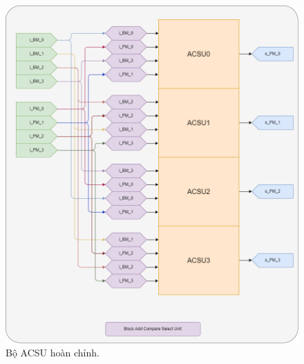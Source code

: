 \begin{figure}[H]
	\centering
	\includegraphics[width=.8\linewidth]{sections/pic/mophongbangSystemVerilog/ACSU.png}
	\caption{Bộ ACSU hoàn chỉnh.}
\end{figure}

